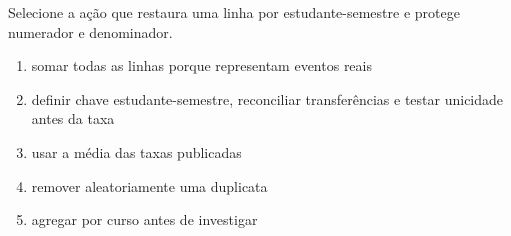 \documentclass[12pt,a4paper]{article}
\begin{document}
\FonteDidatica

\Comando Selecione a ação que restaura uma linha por estudante-semestre e protege numerador e denominador.

\begin{enumerate}[label=\Alph*)]
  \item somar todas as linhas porque representam eventos reais
  \item definir chave estudante-semestre, reconciliar transferências e testar unicidade antes da taxa
  \item usar a média das taxas publicadas
  \item remover aleatoriamente uma duplicata
  \item agregar por curso antes de investigar
\end{enumerate}
\end{document}
